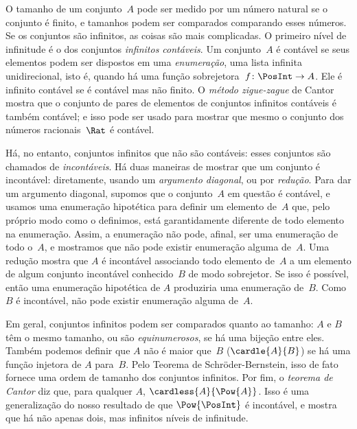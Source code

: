O tamanho de um conjunto~$A$ pode ser medido por um número natural se o conjunto
é finito, e tamanhos podem ser comparados comparando esses números. Se os conjuntos
são infinitos, as coisas são mais complicadas. O primeiro nível de
infinitude é o dos conjuntos \emph{infinitos contáveis}. Um conjunto~$A$ é
contável se seus elementos podem ser dispostos em uma \emph{enumeração}, uma
lista infinita unidirecional, isto é, quando há uma
função sobrejetora~$f\colon \PosInt \to A$. Ele é infinito contável
se é contável mas não finito. O \emph{método zigue-zague} de Cantor
mostra que o conjunto de pares de elementos de conjuntos infinitos contáveis é
também contável; e isso pode ser usado para mostrar que mesmo o conjunto dos
números racionais~$\Rat$ é contável.

Há, no entanto, conjuntos infinitos que não são contáveis: esses conjuntos
são chamados de \emph{incontáveis}. Há duas maneiras de mostrar que um
conjunto é incontável: diretamente, usando um \emph{argumento diagonal}, ou por
\emph{redução}. Para dar um argumento diagonal, supomos que o
conjunto~$A$ em questão é contável, e usamos uma enumeração hipotética
para definir um elemento de~$A$ que, pelo próprio modo como o definimos, está
garantidamente diferente de todo elemento na enumeração. Assim,
a enumeração não pode, afinal, ser uma enumeração de todo o~$A$, e
mostramos que não pode existir enumeração alguma de~$A$. Uma redução mostra
que $A$ é incontável associando todo elemento de~$A$ a um
elemento de algum conjunto incontável conhecido~$B$ de modo sobrejetor. Se
isso é possível, então uma enumeração hipotética de $A$ produziria
uma enumeração de~$B$. Como $B$ é incontável, não pode existir enumeração alguma de~$A$.

Em geral, conjuntos infinitos podem ser comparados quanto ao tamanho: $A$ e $B$ têm
o mesmo tamanho, ou são \emph{equinumerosos}, se há uma bijeção entre
eles. Também podemos definir que $A$ não é maior que~$B$
($\cardle{A}{B}$) se há uma função injetora de $A$ para~$B$.
Pelo Teorema de Schr\"oder-Bernstein, isso de fato fornece uma ordem de
tamanho dos conjuntos infinitos. Por fim, o \emph{teorema de Cantor} diz que, para
qualquer $A$, $\cardless{A}{\Pow{A}}$. Isso é uma generalização do nosso
resultado de que $\Pow{\PosInt}$ é incontável, e mostra que há
não apenas dois, mas infinitos níveis de infinitude.
